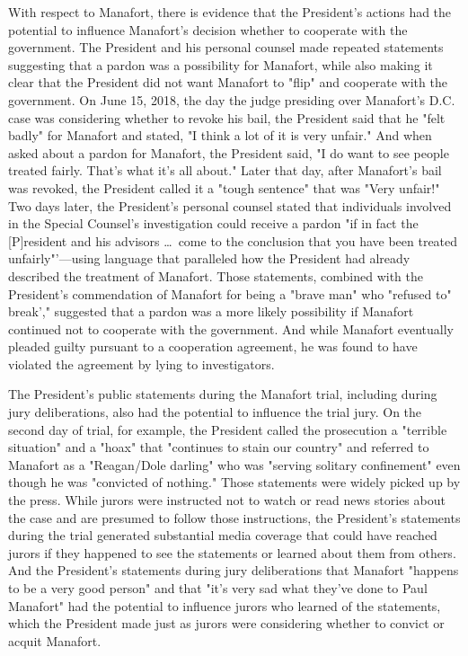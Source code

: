 {With respect to Manafort, there is evidence that the President's actions had the potential to influence Manafort's decision whether to cooperate with the government.
The President and his personal counsel made repeated statements suggesting that a pardon was a possibility for Manafort, while also making it clear that the President did not want Manafort to "flip" and cooperate with the government.
On June 15, 2018, the day the judge presiding over Manafort's D.C. case was considering whether to revoke his bail, the President said that he "felt badly" for Manafort and stated, "I think a lot of it is very unfair."
And when asked about a pardon for Manafort, the President said, "I do want to see people treated fairly.
That's what it's all about." Later that day, after Manafort's bail was revoked, the President called it a "tough sentence" that was "Very unfair!"
Two days later, the President's personal counsel stated that individuals involved in the Special Counsel's investigation could receive a pardon "if in fact the [P]resident and his advisors \dots\ come to the conclusion that you have been treated unfairly"'---using language that paralleled how the President had already described the treatment of Manafort.
Those statements, combined with the President's commendation of Manafort for being a "brave man" who "refused to" break'," suggested that a pardon was a more likely possibility if Manafort continued not to cooperate with the government.
And while Manafort eventually pleaded guilty pursuant to a cooperation agreement, he was found to have violated the agreement by lying to investigators.

The President's public statements during the Manafort trial, including during jury deliberations, also had the potential to influence the trial jury.
On the second day of trial, for example, the President called the prosecution a "terrible situation" and a "hoax" that "continues to stain our country" and referred to Manafort as a "Reagan/Dole darling" who was "serving solitary confinement" even though he was "convicted of nothing."
Those statements were widely picked up by the press.
While jurors were instructed not to watch or read news stories about the case and are presumed to follow those instructions, the President's statements during the trial generated substantial media coverage that could have reached jurors if they happened to see the statements or learned about them from others.
And the President's statements during jury deliberations that Manafort "happens to be a very good person" and that "it's very sad what they've done to Paul Manafort" had the potential to influence jurors who learned of the statements, which the President made just as jurors were considering whether to convict or acquit Manafort.

}
